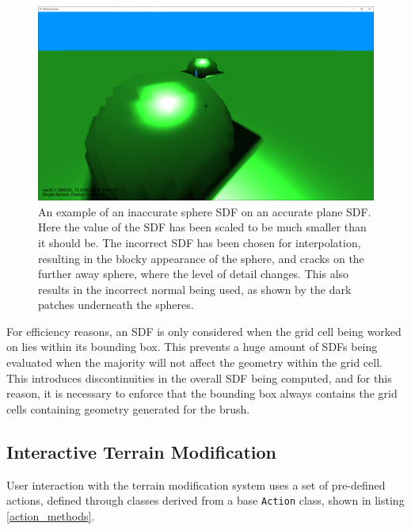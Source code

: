 \documentclass[11pt]{article}
\begin{document}
\begin{figure}[H]
  \includegraphics[width=\textwidth]{inaccurate_sdf.png}
  \caption{An example of an inaccurate sphere SDF on an accurate plane SDF. Here the value of the SDF has been scaled to be much smaller than it should be. The incorrect SDF has been chosen for interpolation, resulting in the blocky appearance of the sphere, and cracks on the further away sphere, where the level of detail changes. This also results in the incorrect normal being used, as shown by the dark patches underneath the spheres.}
  \label{fig:inaccurate_sdf}
\end{figure}

For efficiency reasons, an SDF is only considered when the grid cell being worked on lies within its bounding box. This prevents a huge amount of SDFs being evaluated when the majority will not affect the geometry within the grid cell. This introduces discontinuities in the overall SDF being computed, and for this reason, it is necessary to enforce that the bounding box always contains the grid cells containing geometry generated for the brush.

\subsection{Interactive Terrain Modification}
User interaction with the terrain modification system uses a set of pre-defined actions, defined through classes derived from a base \texttt{Action} class, shown in listing \ref{action_methods}.
\end{document}
